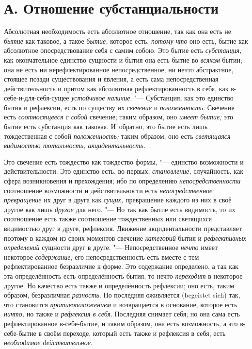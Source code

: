 \section[А. Отношение субстанциальности]{А. Отношение субстанциальности}

Абсолютная необходимость есть абсолютное
отношение, так как она есть не {\em бытие} как таковое,
а такое {\em бытие,} которое есть,
{\em потому что} оно есть, бытие как абсолютное
опосредствование себя с самим собою. Это бытие есть
{\em субстанция;} как окончательное единство сущности и
бытия она есть бытие во {\em всяком} бытии; она не есть
ни нерефлектированное непосредственное, ни нечто абстрактное, стоящее
позади существования и явления, а есть сама непосредственная
действительность и притом как абсолютная рефлектированность в себя, как
в-себе-и-для-себя-сущее {\em устойчивое наличие}. "---
Субстанция, как это единство бытия и рефлексии, есть по существу их
{\em свечение} и {\em положенность}. Свечение есть
{\em соотносящееся с собой} свечение; таким образом,
оно {\em имеет бытие;} это бытие есть субстанция как
таковая. И~обратно, это бытие есть лишь тождественная с собой
{\em положенность;} таким образом, оно есть
{\em светящаяся видимостью тотальность, акцидентальность.}

Это свечение есть тождество как тождество формы, "--- единство возможности и
действительности. Это единство есть, во-первых,
{\em становление,} случайность, как сфера возникновения
и прехождения; ибо по определению
{\em непосредственности} соотношение возможности и
действительности есть {\em непосредственное
превращение} их друг в друга как {\em сущих,}
превращение каждого из них в своё другое как лишь
{\em другое} для него. "--- Но так как бытие есть
видимость, то их соотношение есть также соотношение тождественных или
светящихся видимостью друг в друге, рефлексия. Движение акцидентальности
представляет поэтому в каждом из своих моментов свечение {\em категорий}
бытия и {\em рефлективных определений} сущности друг в друге. "---
Непосредственное {\em нечто} имеет некоторое
{\em содержание;} его непосредственность есть вместе с
тем рефлектированное безразличие к форме. Это содержание определено, а так
как эта определённость есть определённость бытия, то нечто
{\em переходит} в некоторое другое. Но качество есть
также и определённость рефлексии; оно есть, таким образом, безразличная
{\em разность}. Но последняя оживляется (begeistet sich)
так, что становится {\em противоположением} и
возвращается в основание, которое есть {\em ничто,} но
также и {\em рефлексия в себя}. Последняя снимает себя;
но она сама есть рефлектированное в-себе-бытие, и таким образом, она есть
возможность, а это в-себе-бытие в своём переходе, который есть также и
рефлексия в себя, есть {\em необходимое действительное}.

